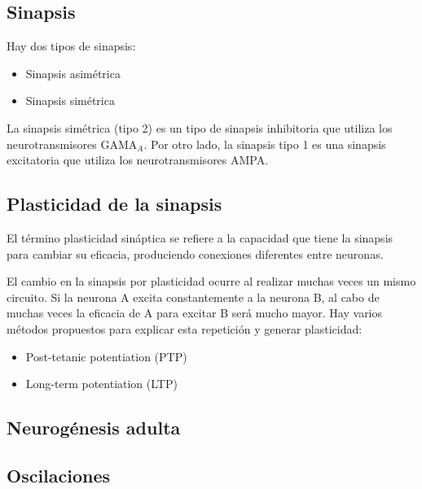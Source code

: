 \documentclass[12pt, letterpaper]{article}
\begin{document}
\subsection{Sinapsis}
Hay dos tipos de sinapsis:
\begin{itemize}
    \item Sinapsis asimétrica
    \item Sinapsis simétrica 
\end{itemize}

La sinapsis simétrica (tipo 2) es un tipo de sinapsis inhibitoria que utiliza los neurotransmisores GAMA$_A$. Por otro lado, la sinapsis tipo 1 es una sinapsis excitatoria que utiliza los neurotransmisores AMPA. 


\subsection{Plasticidad de la sinapsis}
El término plasticidad sináptica se refiere a la capacidad que tiene la sinapsis para cambiar su eficacia, produciendo conexiones diferentes entre neuronas.

El cambio en la sinapsis por plasticidad ocurre al realizar muchas veces un mismo circuito. Si la neurona A excita constantemente a la neurona B, al cabo de muchas veces la eficacia de A para excitar B será mucho mayor. Hay varios métodos propuestos para explicar esta repetición y generar plasticidad:
\begin{itemize}
    \item Post-tetanic potentiation (PTP)
    \item Long-term potentiation (LTP)
\end{itemize}


\subsection{Neurogénesis adulta}

\subsection{Oscilaciones}
\end{document}
